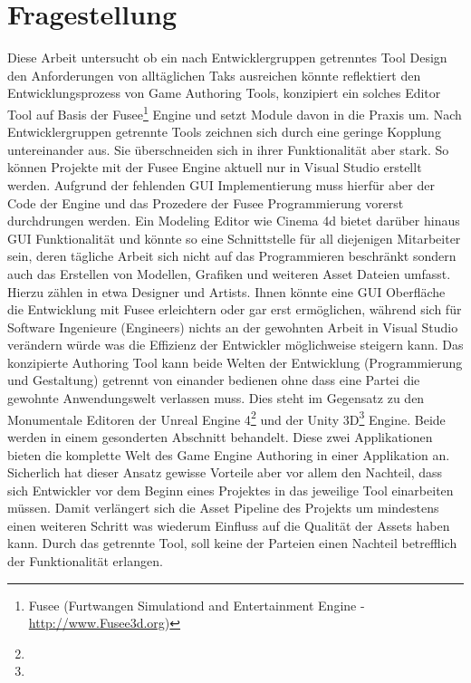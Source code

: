 \documentclass[pagesize, paper=a4, fontsize=12pt, titlepage=true, headings=small, headnosepline, abstractoff, liststotoc, nochapterprefix, plainheadsepline, twoside]{scrreprt}
\begin{document}
\section{Fragestellung}
Diese Arbeit untersucht ob ein nach Entwicklergruppen getrenntes Tool Design den Anforderungen von alltäglichen Taks ausreichen könnte reflektiert den Entwicklungsprozess von Game Authoring Tools, konzipiert ein solches Editor Tool auf Basis der Fusee\footnote{Fusee (Furtwangen Simulationd and Entertainment Engine - \url{http://www.Fusee3d.org})} Engine und setzt Module davon in die Praxis um. Nach Entwicklergruppen getrennte Tools zeichnen sich durch eine geringe Kopplung untereinander aus. Sie überschneiden sich in ihrer Funktionalität aber stark. So können Projekte mit der Fusee Engine aktuell nur in Visual Studio erstellt werden. Aufgrund der fehlenden GUI Implementierung muss hierfür aber der Code der Engine und das Prozedere der Fusee Programmierung vorerst durchdrungen werden. Ein Modeling Editor wie Cinema 4d bietet darüber hinaus GUI Funktionalität und könnte so eine Schnittstelle für all diejenigen Mitarbeiter sein, deren tägliche Arbeit sich nicht auf das Programmieren beschränkt sondern auch das Erstellen von Modellen, Grafiken und weiteren Asset Dateien umfasst. Hierzu zählen in etwa Designer und Artists. Ihnen könnte eine GUI Oberfläche die Entwicklung mit Fusee erleichtern oder gar erst ermöglichen, während sich für Software Ingenieure (Engineers) nichts an der gewohnten Arbeit in Visual Studio verändern würde was die Effizienz der Entwickler möglichweise steigern kann. Das konzipierte Authoring Tool kann beide Welten der Entwicklung (Programmierung und Gestaltung) getrennt von einander bedienen ohne dass eine Partei die gewohnte Anwendungswelt verlassen muss. Dies steht im Gegensatz zu den Monumentale Editoren der Unreal Engine 4\footnote{} und der Unity 3D\footnote{} Engine. Beide werden in einem gesonderten Abschnitt behandelt. Diese zwei Applikationen bieten die komplette Welt des Game Engine Authoring in einer Applikation an. Sicherlich hat dieser Ansatz gewisse Vorteile aber vor allem den Nachteil, dass sich Entwickler vor dem Beginn eines Projektes in das jeweilige Tool einarbeiten müssen. Damit verlängert sich die Asset Pipeline des Projekts um mindestens einen weiteren Schritt was wiederum Einfluss auf die Qualität der Assets haben kann. Durch das getrennte Tool, soll keine der Parteien einen Nachteil betrefflich der Funktionalität erlangen.
\end{document}
